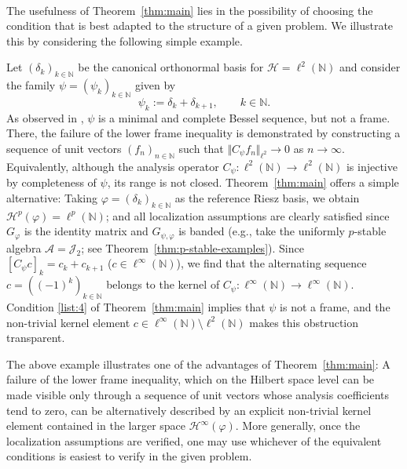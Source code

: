 \documentclass{amsart}
\def\Hil{\mathcal{H}}
\def\lukas{\color{blue}}
\begin{document}

\


\noindent The usefulness of Theorem~\ref{thm:main} lies in the possibility of choosing the condition that is best adapted to the structure of a given problem. We illustrate this by considering the following simple example.

Let $(\delta_k)_{k\in \mathbb{N}}$ be the canonical orthonormal basis for $\Hil = \ell^2(\mathbb{N})$ and consider the family $\psi = (\psi_k)_{k\in \mathbb{N}}$ given by 
$$\psi_k := \delta_k+\delta_{k+1}, \qquad k\in\mathbb{N}.$$
As observed in \cite[Example~5.4.6]{ole1n}, $\psi$ is a minimal and complete Bessel sequence, but not a frame. There, the failure of the lower frame inequality is demonstrated by constructing a sequence of unit vectors $(f_n)_{n\in\mathbb N}$ such that $\Vert C_\psi f_n \Vert_{\ell^2}\to0$ as $n\to \infty$. Equivalently, although the analysis operator $C_\psi:\ell^2(\mathbb N)\to\ell^2(\mathbb N)$ is injective by completeness of $\psi$, its range is not closed. Theorem~\ref{thm:main} offers a simple alternative: Taking $\varphi=(\delta_k)_{k\in\mathbb{N}}$ as the reference Riesz basis, we obtain $\Hil^p(\varphi) = \ell^p(\mathbb{N})$; and all localization assumptions are clearly satisfied since $G_{\varphi}$ is the identity matrix and $G_{\psi,\varphi}$ is banded (e.g., take the uniformly $p$-stable algebra \(\mathcal A=\mathcal J_2\); see Theorem~\ref{thm:p-stable-examples}). Since $[C_\psi c]_k=c_k+c_{k+1}$ ($c\in\ell^\infty(\mathbb N)$), we find that the alternating sequence $c=( (-1)^k )_{k\in\mathbb N}$ belongs to the kernel of $C_\psi:\ell^\infty(\mathbb{N})\to\ell^\infty(\mathbb{N})$. Condition \ref{list:4} of Theorem~\ref{thm:main} implies that $\psi$ is not a frame, and the non-trivial kernel element $c\in \ell^{\infty}(\mathbb{N} )\setminus \ell^2(\mathbb{N})$ makes this obstruction transparent.

The above example illustrates one of the advantages of Theorem~\ref{thm:main}: A failure of the lower frame inequality, which on the Hilbert space level can be made visible only through a sequence of unit vectors whose analysis coefficients tend to zero, can be alternatively described by an explicit non-trivial kernel element contained in the larger space $\Hil^{\infty}(\varphi)$. More generally, once the localization assumptions are verified, one may use whichever of the equivalent conditions is easiest to verify in the given problem.
\end{document}
